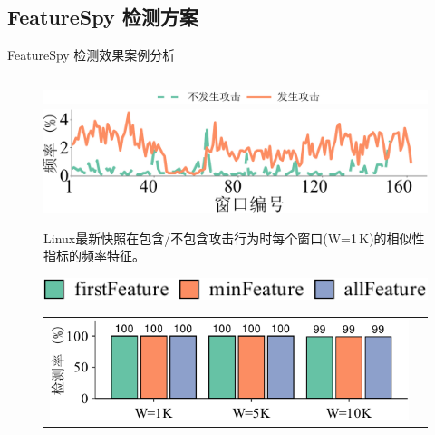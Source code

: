 \documentclass{beamer}
\newcommand{\sysnameF}{FeatureSpy }
\begin{document}
\subsection{\sysnameF 检测方案}

\begin{frame}{\sysnameF 检测效果案例分析}
    \begin{columns}
        \begin{column}{.6\textwidth}
            \vspace{-1em}
            \begin{figure}[!htb]
                \centering
                \includegraphics[width=\linewidth]{../pic/featurespy/plot/detection/overall/prefixDistribution_legend.pdf}\\
                \includegraphics[width=\linewidth]{../pic/featurespy/plot/detection/overall/prefixDistribution-1000-Linux-min.pdf}\\
                \caption{Linux最新快照在包含/不包含攻击行为时每个窗口(W=1\,K)的相似性指标的频率特征。}
                \label{fig:featurespy-expDetectionOverall}
            \end{figure}
            \vspace{-2em}
            \begin{figure}[!htb]
                \centering
                \includegraphics[width=0.66\linewidth]{../pic/featurespy/plot/detection/overall/effectiveness-falsePositive_legend.pdf}
                \vspace{5pt}\\
                \begin{tabular}{@{\ }c@{\ }c}
                    \includegraphics[width=0.66\linewidth]{../pic/featurespy/plot/detection/overall/effectivenessLinux.pdf} &

\end{tabular}
\end{figure}
\end{column}
\end{columns}
\end{frame}
\end{document}

